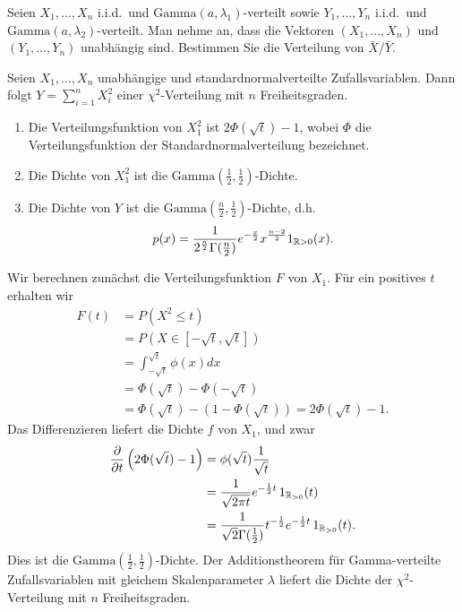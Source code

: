 Seien $X_1,\ldots,X_n$ i.i.d.\ und $\textrm{Gamma}(a, \lambda_1)$-verteilt sowie
$Y_1,\ldots,Y_n$ i.i.d.\ und $\textrm{Gamma}(a,\lambda_2)$-verteilt. Man nehme an,
dass die Vektoren $(X_1,\ldots,X_n)$ und $(Y_1,\ldots,Y_n)$ unabhängig sind. 
Bestimmen Sie die Verteilung von $\bar X/\bar Y$.

Seien $X_1,\ldots,X_n$ unabhängige und standardnormalverteilte
Zufallsvariablen. Dann folgt $Y= \sum_{i=1}^{n} X_i^2$ einer
$\chi^2$-Verteilung mit $n$ Freiheitsgraden. 
\begin{enumerate}
    \item Die Verteilungsfunktion von $X_1^2$ ist $2\Phi(\sqrt{t})-1$, wobei
        $\Phi$ die Verteilungsfunktion der Standardnormalverteilung bezeichnet. 
    \item Die Dichte von $X_1^2$ ist die $\text{Gamma}(\frac{1}{2},\frac{1}{2})$-Dichte. 
    \item Die Dichte von $Y$ ist die $\text{Gamma}(\frac{n}{2},\frac{1}{2})$-Dichte, d.h.\
        \begin{equation*}
            p(x) = \frac{1}{ 2^{\frac{n}{2}} 
            \Gamma(\frac{n}{2})}e^{-\frac{x}{2}} x^{\frac{n-2}{2}} 1_{\mathbb R>0}(x).
        \end{equation*}
\end{enumerate}
\solution
Wir berechnen zunächst die Verteilungsfunktion $F$ von $X_1$. Für ein positives $t$
erhalten wir
\begin{align*}
    F(t) &= P \left( X^2 \leq t \right) \\
    &= P \left( X \in \left[ -\sqrt{t}, \sqrt{t} \right]  \right) \\
    &= \int_{-\sqrt{t}}^{\sqrt{t}} \phi(x) dx \\
    &= \Phi(\sqrt{t}) - \Phi(-\sqrt{t}) \\
    &= \Phi(\sqrt{t}) - (1 - \Phi(\sqrt{t})) = 2 \Phi(\sqrt{t}) -1. 
\end{align*}
Das Differenzieren liefert die Dichte $f$ von $X_1$, und zwar
\begin{align*}
    \frac{\partial}{\partial t} \left( 2 \Phi(\sqrt{t}) - 1 \right) 
    &= \phi(\sqrt{t}) \frac{1}{\sqrt{t}} \\
    &= \frac{1}{\sqrt{2\pi t}} e^{-\frac{1}{2}t} \, 1_{\mathbb R_{>0}}(t) \\
    &= \frac{1}{\sqrt{2}\Gamma(\frac{1}{2})} t^{-\frac{1}{2}} e^{-\frac{1}{2}t} \, 1_{\mathbb R_{>0}}(t).
\end{align*}
Dies ist die $\text{Gamma}(\frac{1}{2}, \frac{1}{2})$-Dichte. Der
Additionstheorem für Gamma-verteilte Zufallsvariablen mit gleichem
Skalenparameter $\lambda$ liefert die Dichte der $\chi^{2}$-Verteilung mit $n$
Freiheitsgraden. 



